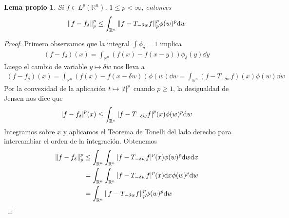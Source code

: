 \documentclass{article}
\newcommand{\realNumbers}{\mathbb{R}}
\newtheorem{myLemma}{Lema propio}
\theoremstyle{remark}
\begin{document}
\begin{myLemma}
  Si \(f \in L^p(\realNumbers^n)\), \(1 \leq p < \infty\), entonces 
  \begin{align}
    \norm{f - f_{\delta}}_p^p 
    \leq 
    \int_{\realNumbers^n} \norm{f - T_{- \delta w} f}_p^p \phi(w)^p \dd w
  \end{align}
\end{myLemma}
\begin{proof}
  Primero observamos que la integral \(\int \phi_{\delta} = 1\) implica
  \begin{align}
    (f - f_{\delta}) (x)
    =
    \int_{\realNumbers^n} (f(x) - f(x - y)) \phi_{\delta}(y) \dd y
  \end{align}
  Luego el cambio de variable \(y \mapsto \delta w\) nos lleva a
  \begin{align}
    (f - f_{\delta}) (x)
    =
    \int_{\realNumbers^n} (f(x) - f(x - \delta w)) \phi(w) \dd w
    =
    \int_{\realNumbers^n} (f - T_ {- \delta w} f) (x) \phi(w) \dd w
  \end{align}
  Por la convexidad de la aplicación \(t \mapsto \abs{t}^p\) cuando \(p \geq 1\), la desigualdad de Jensen nos dice que
  \begin{align}
    \abs{f - f_{\delta}}^p (x)
    \leq
    \int_{\realNumbers^n} \abs{f - T_{- \delta w} f}^p (x) \phi(w)^p \dd w
  \end{align}
  Integramos sobre \(x\) y aplicamos el Teorema de Tonelli del lado derecho para intercambiar el orden de la integración.
  Obtenemos
  \begin{align}
    \norm{f - f_{\delta}}_p^p
    &\leq
    \int_{\realNumbers^n} 
      \int_{\realNumbers^n} 
        \abs{f - T_{- \delta w} f}^p (x) \phi(w)^p 
      \dd w
    \dd x
    \\
    &=
    \int_{\realNumbers^n}
      \int_{\realNumbers^n}
        \abs{f - T_{- \delta w} f}^p (x)
      \dd x 
      \phi(w)^p 
    \dd w
    \\
    &=
    \int_{\realNumbers^n}
      \norm{f - T_{- \delta w} f}_p^p 
      \phi(w)^p 
    \dd w
  \end{align}
  
\end{proof}
\end{document}
